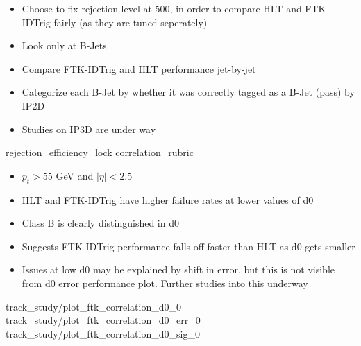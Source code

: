     { \begin{itemize}
        \item Choose to fix rejection level at 500,
            in order to compare HLT and FTK-IDTrig fairly (as they are tuned seperately)
        \item Look only at B-Jets
        \item Compare FTK-IDTrig and HLT performance jet-by-jet
        \item Categorize each B-Jet by whether it was correctly tagged as a B-Jet (pass) by IP2D
        \item Studies on IP3D are under way
    \end{itemize} }
    {rejection_efficiency_lock}
    {correlation_rubric}

    { \begin{itemize}
        \item $p_t > 55$ GeV and $|\eta| < 2.5$
        \item HLT and FTK-IDTrig have higher failure rates at lower values of d0
        \item Class B is clearly distinguished in d0
        \item Suggests FTK-IDTrig performance falls off faster than HLT as d0 gets smaller
        \item Issues at low d0 may be explained by shift in error,
            but this is not visible from d0 error performance plot.
            Further studies into this underway
    \end{itemize} }
    {track_study/plot_ftk_correlation_d0_0}
    {track_study/plot_ftk_correlation_d0_err_0}
    {track_study/plot_ftk_correlation_d0_sig_0}
